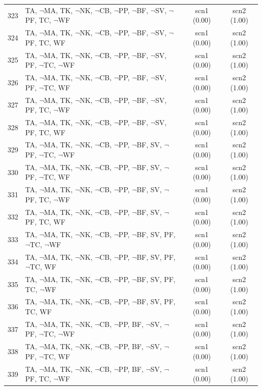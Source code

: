 \documentclass[12pt]{article}
\begin{document}
\begin{longtable}{|l|l|c|c|}
323 & TA, $\neg$MA, TK, $\neg$NK, $\neg$CB, $\neg$PP, $\neg$BF, $\neg$SV, $\neg$PF, TC, $\neg$WF & scn1 (0.00) & scn2 (1.00)\\
324 & TA, $\neg$MA, TK, $\neg$NK, $\neg$CB, $\neg$PP, $\neg$BF, $\neg$SV, $\neg$PF, TC, WF & scn1 (0.00) & scn2 (1.00)\\
325 & TA, $\neg$MA, TK, $\neg$NK, $\neg$CB, $\neg$PP, $\neg$BF, $\neg$SV, PF, $\neg$TC, $\neg$WF & scn1 (0.00) & scn2 (1.00)\\
326 & TA, $\neg$MA, TK, $\neg$NK, $\neg$CB, $\neg$PP, $\neg$BF, $\neg$SV, PF, $\neg$TC, WF & scn1 (0.00) & scn2 (1.00)\\
327 & TA, $\neg$MA, TK, $\neg$NK, $\neg$CB, $\neg$PP, $\neg$BF, $\neg$SV, PF, TC, $\neg$WF & scn1 (0.00) & scn2 (1.00)\\
328 & TA, $\neg$MA, TK, $\neg$NK, $\neg$CB, $\neg$PP, $\neg$BF, $\neg$SV, PF, TC, WF & scn1 (0.00) & scn2 (1.00)\\
329 & TA, $\neg$MA, TK, $\neg$NK, $\neg$CB, $\neg$PP, $\neg$BF, SV, $\neg$PF, $\neg$TC, $\neg$WF & scn1 (0.00) & scn2 (1.00)\\
330 & TA, $\neg$MA, TK, $\neg$NK, $\neg$CB, $\neg$PP, $\neg$BF, SV, $\neg$PF, $\neg$TC, WF & scn1 (0.00) & scn2 (1.00)\\
331 & TA, $\neg$MA, TK, $\neg$NK, $\neg$CB, $\neg$PP, $\neg$BF, SV, $\neg$PF, TC, $\neg$WF & scn1 (0.00) & scn2 (1.00)\\
332 & TA, $\neg$MA, TK, $\neg$NK, $\neg$CB, $\neg$PP, $\neg$BF, SV, $\neg$PF, TC, WF & scn1 (0.00) & scn2 (1.00)\\
333 & TA, $\neg$MA, TK, $\neg$NK, $\neg$CB, $\neg$PP, $\neg$BF, SV, PF, $\neg$TC, $\neg$WF & scn1 (0.00) & scn2 (1.00)\\
334 & TA, $\neg$MA, TK, $\neg$NK, $\neg$CB, $\neg$PP, $\neg$BF, SV, PF, $\neg$TC, WF & scn1 (0.00) & scn2 (1.00)\\
335 & TA, $\neg$MA, TK, $\neg$NK, $\neg$CB, $\neg$PP, $\neg$BF, SV, PF, TC, $\neg$WF & scn1 (0.00) & scn2 (1.00)\\
336 & TA, $\neg$MA, TK, $\neg$NK, $\neg$CB, $\neg$PP, $\neg$BF, SV, PF, TC, WF & scn1 (0.00) & scn2 (1.00)\\
337 & TA, $\neg$MA, TK, $\neg$NK, $\neg$CB, $\neg$PP, BF, $\neg$SV, $\neg$PF, $\neg$TC, $\neg$WF & scn1 (0.00) & scn2 (1.00)\\
338 & TA, $\neg$MA, TK, $\neg$NK, $\neg$CB, $\neg$PP, BF, $\neg$SV, $\neg$PF, $\neg$TC, WF & scn1 (0.00) & scn2 (1.00)\\
339 & TA, $\neg$MA, TK, $\neg$NK, $\neg$CB, $\neg$PP, BF, $\neg$SV, $\neg$PF, TC, $\neg$WF & scn1 (0.00) & scn2 (1.00)\\

\end{longtable}
\end{document}
